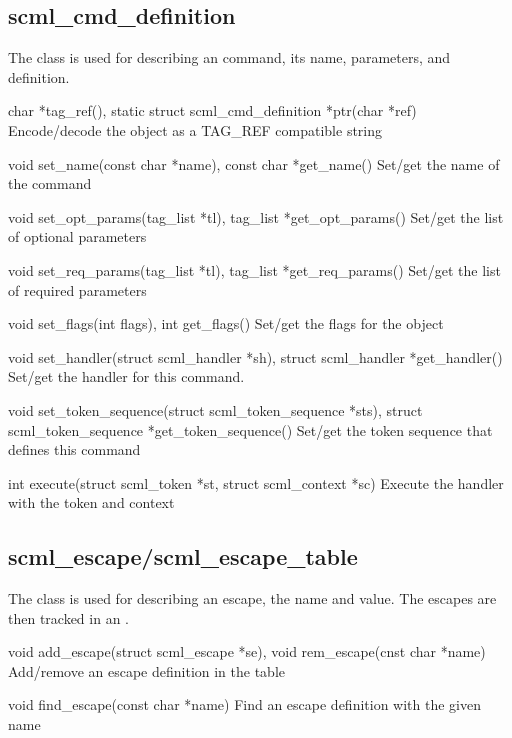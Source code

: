 \subsection{scml\_cmd\_definition}

The  class is used for describing an \SCML{} command,
its name, parameters, and definition.

\begin{cprototypelist}
  \item[char *tag_ref(), static struct scml_cmd_definition
  *ptr(char *ref)] Encode/decode the object as a TAG\_REF compatible string

  \item[void set_name(const char *name), const char *get_name()]
  Set/get the name of the command

  \item[void set_opt_params(tag_list *tl), tag_list
  *get_opt_params()] Set/get the list of optional parameters

  \item[void set_req_params(tag_list *tl), tag_list
  *get_req_params()] Set/get the list of required parameters

  \item[void set_flags(int flags), int get_flags()] Set/get the
  flags for the object

  \item[void set_handler(struct scml_handler *sh), struct
  scml_handler *get_handler()] Set/get the handler for this command.

  \item[void set_token_sequence(struct scml_token_sequence *sts),
  struct scml_token_sequence *get_token_sequence()] Set/get the token sequence
  that defines this command

  \item[int execute(struct scml_token *st, struct scml_context
  *sc)] Execute the handler with the token and context
\end{cprototypelist}

\subsection{scml\_escape/scml\_escape\_table}

The  class is used for describing an \SCML{} escape, the name
and value.  The escapes are then tracked in an .

\begin{cprototypelist}
  \item[void add_escape(struct scml_escape *se),
		    void rem_escape(cnst char *name)] Add/remove an escape
  definition in the table

  \item[void find_escape(const char *name)] Find an escape
  definition with the given name
\end{cprototypelist}

